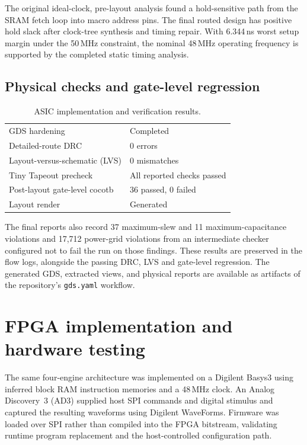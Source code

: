 \documentclass[11pt]{article}
\begin{document}
The original ideal-clock, pre-layout analysis found a hold-sensitive path from the SRAM fetch loop into macro address pins. The final routed design has positive hold slack after clock-tree synthesis and timing repair. With 6.344\,ns worst setup margin under the 50\,MHz constraint, the nominal 48\,MHz operating frequency is supported by the completed static timing analysis.

\subsection{Physical checks and gate-level regression}
\begin{table}[!htbp]
\centering\small
\caption{ASIC implementation and verification results.}\label{tab:asicchecks}
\begin{tabularx}{\linewidth}{@{}lL@{}}
\toprule
GDS hardening & Completed \\
Detailed-route DRC & 0 errors \\
Layout-versus-schematic (LVS) & 0 mismatches \\
Tiny Tapeout precheck & All reported checks passed \\
Post-layout gate-level cocotb & 36 passed, 0 failed \\
Layout render & Generated \\
\bottomrule
\end{tabularx}
\end{table}

The final reports also record 37 maximum-slew and 11 maximum-capacitance violations and 17,712 power-grid violations from an intermediate checker configured not to fail the run on those findings. These results are preserved in the flow logs, alongside the passing DRC, LVS and gate-level regression. The generated GDS, extracted views, and physical reports are available as artifacts of the repository's \texttt{gds.yaml} workflow.

\section{FPGA implementation and hardware testing}

The same four-engine architecture was implemented on a Digilent Basys3 using inferred block RAM instruction memories and a 48\,MHz clock. An Analog Discovery~3 (AD3) supplied host SPI commands and digital stimulus and captured the resulting waveforms using Digilent WaveForms. Firmware was loaded over SPI rather than compiled into the FPGA bitstream, validating runtime program replacement and the host-controlled configuration path.
\end{document}
